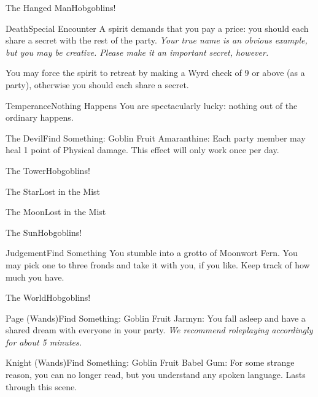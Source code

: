 \documentclass[white]{gl2018}
\begin{document}
\begin{location}{The Hanged Man}{Hobgoblins!}
\end{location}
\begin{location}{Death}{Special Encounter}
A spirit demands that you pay a price: you should each share a secret with the rest of the party.  {\em Your true name is an obvious example, but you may be creative.  Please make it an important secret, however.}

You may force the spirit to retreat by making a Wyrd check of 9 or above (as a party), otherwise you should each share a secret.
\end{location}
\begin{location}{Temperance}{Nothing Happens}
You are spectacularly lucky: nothing out of the ordinary happens.
\end{location}
\begin{location}{The Devil}{Find Something: Goblin Fruit}
Amaranthine: Each party member may heal 1 point of Physical damage.  This effect will only work once per day.
\end{location}
\begin{location}{The Tower}{Hobgoblins!}
\end{location}
\begin{location}{The Star}{Lost in the Mist}
\end{location}
\begin{location}{The Moon}{Lost in the Mist}
\end{location}
\begin{location}{The Sun}{Hobgoblins!}
\end{location}
\begin{location}{Judgement}{Find Something}
You stumble into a grotto of Moonwort Fern.  You may pick one to three fronds and take it with you, if you like.  Keep track of how much you have.
\end{location}
\begin{location}{The World}{Hobgoblins!}
\end{location}
\begin{location}{Page (Wands)}{Find Something: Goblin Fruit}
Jarmyn: You fall asleep and have a shared dream with everyone in your party. \emph{We recommend roleplaying accordingly for about 5 minutes.}
\end{location}
\begin{location}{Knight (Wands)}{Find Something: Goblin Fruit}
Babel Gum:  For some strange reason, you can no longer read, but you understand any spoken language.  Lasts through this scene.
\end{location}
\end{document}
